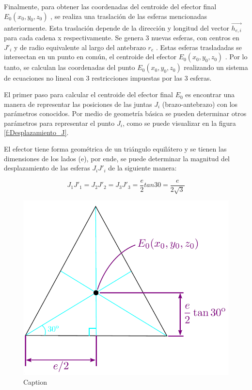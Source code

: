         Finalmente, para obtener las coordenadas del centroide del efector final   $E_{0} \left( x_{0},y_{0},z_{0} \right)$   , se realiza una traslación de las esferas mencionadas anteriormente. Esta traslación depende de la dirección y longitud del vector   $\overrightarrow{h_{e,i}}$   para cada cadena x respectivamente. Se genera 3 nuevas esferas, con centros en   $J'_{i}$   y de radio equivalente al largo del antebrazo   $r_{e}$  . Estas esferas trasladadas se intersectan en un punto en común, el centroide del efector   $E_{0} \left( x_{0},y_{0},z_{0} \right)$  . Por lo tanto, se calculan las coordenadas del punto  $E_{0} \left( x_{0},y_{0},z_{0} \right)$    realizando un sistema de ecuaciones no lineal con 3 restricciones impuestas por las 3 esferas.
        
        El primer paso para calcular el centroide del efector final  $E_{0}$  es encontrar una manera de representar las posiciones de las juntas  $J_{i}$  (brazo-antebrazo) con los parámetros conocidos. Por medio de geometría básica se pueden determinar otros parámetros para representar el punto   $J_{i}$, como se puede visualizar en la figura \ref{f:Desplazamiento_J}.
        
        El efector tiene forma geométrica de un triángulo equilátero y se tienen las dimensiones de los lados (e), por ende, se puede determinar la magnitud del desplazamiento de las esferas $J_{i}J'_{i}$ de la siguiente manera:
        
        \begin{equation*}
            J_{1}J'_{1}=J_{2}J'_{2}=J_{3}J'_{3}=\frac{e}{2}tan30=\frac{e}{2\sqrt{3}}
        \end{equation*}
    
\newpage
    
            \begin{figure}[htb]
            \centering
            \includegraphics[width=0.5\linewidth]{Main/Chapter4/Images4/DIBUJO9.PNG}
            \caption{Caption}
            \label{fig:ANEXO_MA_C_POS_2}
        \end{figure}

